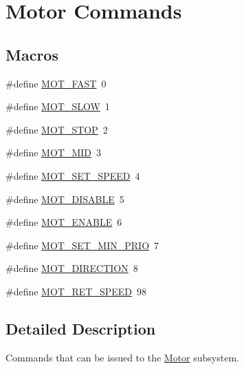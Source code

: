 \hypertarget{group__motor__commands}{\section{Motor Commands}
\label{group__motor__commands}
}
\subsection*{Macros}
\begin{DoxyCompactItemize}
\item 
\#define \hyperlink{group__motor__commands_gae64835867a818685e7e9172a8cb21b9e}{M\-O\-T\-\_\-\-F\-A\-S\-T}~0
\item 
\#define \hyperlink{group__motor__commands_gab1d9e4b8515c9040e93ba9edcdb843a3}{M\-O\-T\-\_\-\-S\-L\-O\-W}~1
\item 
\#define \hyperlink{group__motor__commands_gaf57de7232e513663b5793fce23b2795a}{M\-O\-T\-\_\-\-S\-T\-O\-P}~2
\item 
\#define \hyperlink{group__motor__commands_ga90a66dc37a63d7ff939b606b1d5ba87c}{M\-O\-T\-\_\-\-M\-I\-D}~3
\item 
\#define \hyperlink{group__motor__commands_ga318320d9d310be3e25a20f55ccbda7a6}{M\-O\-T\-\_\-\-S\-E\-T\-\_\-\-S\-P\-E\-E\-D}~4
\item 
\#define \hyperlink{group__motor__commands_gae90f36d9158b625125ec5b6b6b12342d}{M\-O\-T\-\_\-\-D\-I\-S\-A\-B\-L\-E}~5
\item 
\#define \hyperlink{group__motor__commands_ga538be16bfce1294561c04bbfca368475}{M\-O\-T\-\_\-\-E\-N\-A\-B\-L\-E}~6
\item 
\#define \hyperlink{group__motor__commands_ga0c48e1fea8fe34438ee9e9b2e101d1de}{M\-O\-T\-\_\-\-S\-E\-T\-\_\-\-M\-I\-N\-\_\-\-P\-R\-I\-O}~7
\item 
\#define \hyperlink{group__motor__commands_gae0799d3b48368ff66fd88b500aab5d50}{M\-O\-T\-\_\-\-D\-I\-R\-E\-C\-T\-I\-O\-N}~8
\item 
\#define \hyperlink{group__motor__commands_ga931465aec3d487ebea5d34e80f940b8c}{M\-O\-T\-\_\-\-R\-E\-T\-\_\-\-S\-P\-E\-E\-D}~98
\end{DoxyCompactItemize}


\subsection{Detailed Description}
Commands that can be issued to the \hyperlink{classMotor}{Motor} subsystem. 

